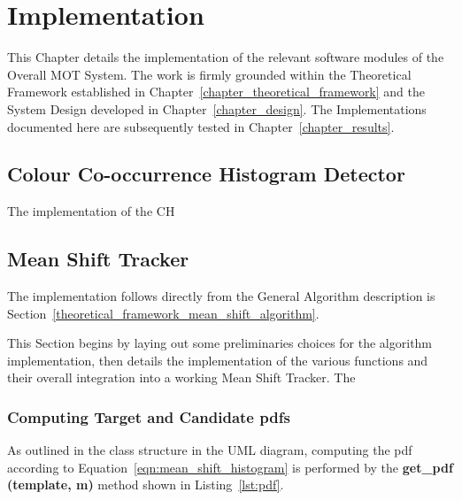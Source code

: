 \chapter{Implementation}\label{chapter_implementation}

This Chapter details the implementation of the relevant software modules of the
Overall MOT System. The work is firmly grounded within the Theoretical Framework
established in Chapter~\ref{chapter_theoretical_framework} and the System Design
developed in Chapter~\ref{chapter_design}. The Implementations documented here
are subsequently tested in Chapter~\ref{chapter_results}.


\section{Colour Co-occurrence Histogram Detector}\label{implementation_ch}
The implementation of the CH 


\section{Mean Shift Tracker}\label{implementation_mean_shift_tracker}
The implementation follows directly from the General Algorithm description is
Section~\ref{theoretical_framework_mean_shift_algorithm}.

This Section begins by laying out some preliminaries choices for the algorithm
implementation, then details the implementation of the various functions and
their overall integration into a working Mean Shift Tracker. The  

\subsection{Computing Target and Candidate pdfs}
As outlined in the class structure in the UML diagram, %
computing the pdf according to Equation~\ref{eqn:mean_shift_histogram} is
performed by the \textbf{get\_pdf (template, m)} method shown in
Listing~\ref{lst:pdf}.

